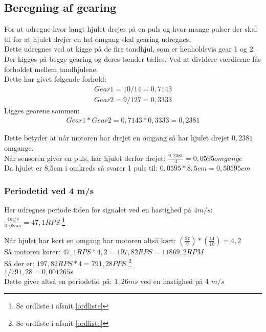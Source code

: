 \subsection{Beregning af gearing}
\label{beregn_gear}

For at udregne hvor langt hjulet drejer på en puls og hvor mange pulser der skal til for at hjulet drejer en hel omgang skal gearing udregnes. \\
Dette udregnes ved at kigge på de fire tandhjul, som er henholdsvis gear 1 og 2. Der kigges på begge gearing og deres tænder tælles. Ved at dividere værdierne fås forholdet mellem tandhjulene. \\
Dette har givet følgende forhold:
\begin{align*}
Gear1 = 10 / 14 = 0,7143 \\
Gear2 = 9 / 127 = 0,3333
\end{align*}
Ligges gearene sammen:
\begin{align*}
Gear1*Gear2 = 0,7143 * 0,3333 = 0,2381
\end{align*}

Dette betyder at når motoren har drejet en omgang så har hjulet drejet \(0,2381\) omgange. \\
Når sensoren giver en puls, har hjulet derfor drejet: \(\frac{0,2381}{4} = 0,0595 omgange\) \\
Da hjulet er 8,5cm i omkreds så svarer 1 puls til: \(0,0595*8,5cm = 0,50595 cm\)

\subsubsection{Periodetid ved 4 m/s}
\label{periode_4ms}
Her udregnes periode tiden for signalet ved en hastighed på $4 m/s$:
$\frac{4m/s}{0,085m} = 47,1 RPS$ \footnote{Se ordliste i afsnit \ref{ordliste}}

Når hjulet har kørt en omgang har motoren altså kørt: $(\frac{27}{9}) * (\frac{14}{10}) = 4,2$ \\
Så motoren kører: \(47,1 RPS * 4,2 = 197,82 RPS = 11869,2 RPM \) \\
Så der er: \(197,82 RPS *4 = 791,28 PPS \) \footnote{Se ordliste i afsnit \ref{ordliste}} \\
\(1/791,28 = 0,001265 s \) \\
Dette giver altså en periodetid på: \(1,26 ms\) ved en hastighed på 4 $m/s$
